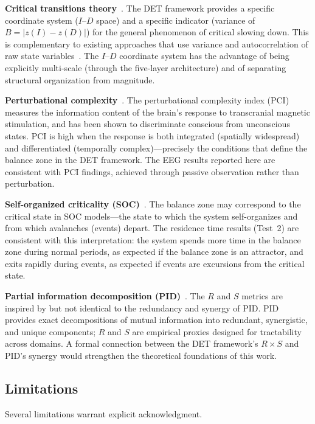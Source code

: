 \documentclass[aip,cha,reprint,amsmath,amssymb,final]{revtex4-2}
\begin{document}
\textbf{Critical transitions theory}~\cite{scheffer2009,strogatz2015}. The DET framework provides a specific coordinate system ($I$--$D$ space) and a specific indicator (variance of $B = |z(I) - z(D)|$) for the general phenomenon of critical slowing down. This is complementary to existing approaches that use variance and autocorrelation of raw state variables~\cite{dakos2012}. The $I$--$D$ coordinate system has the advantage of being explicitly multi-scale (through the five-layer architecture) and of separating structural organization from magnitude.

\textbf{Perturbational complexity}~\cite{casali2013,sarasso2015}. The perturbational complexity index (PCI) measures the information content of the brain's response to transcranial magnetic stimulation, and has been shown to discriminate conscious from unconscious states. PCI is high when the response is both integrated (spatially widespread) and differentiated (temporally complex)---precisely the conditions that define the balance zone in the DET framework. The EEG results reported here are consistent with PCI findings, achieved through passive observation rather than perturbation.

\textbf{Self-organized criticality (SOC)}~\cite{bak1987,olami1992,strogatz2015}. The balance zone may correspond to the critical state in SOC models---the state to which the system self-organizes and from which avalanches (events) depart. The residence time results (Test~2) are consistent with this interpretation: the system spends more time in the balance zone during normal periods, as expected if the balance zone is an attractor, and exits rapidly during events, as expected if events are excursions from the critical state.

\textbf{Partial information decomposition (PID)}~\cite{williams2010,aguilera2019,popiel2020}. The $R$ and $S$ metrics are inspired by but not identical to the redundancy and synergy of PID. PID provides exact decompositions of mutual information into redundant, synergistic, and unique components; $R$ and $S$ are empirical proxies designed for tractability across domains. A formal connection between the DET framework's $R \times S$ and PID's synergy would strengthen the theoretical foundations of this work.

\subsection{Limitations}

Several limitations warrant explicit acknowledgment.
\end{document}
